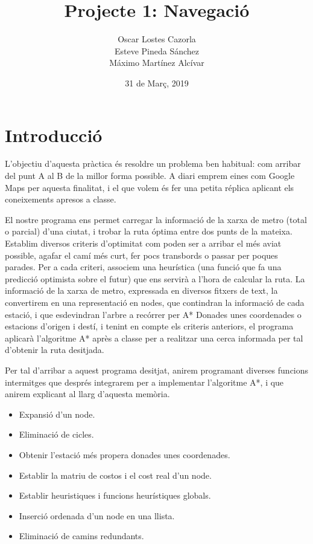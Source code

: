 \documentclass[a4paper,12pt]{article}
\begin{document}
    \title{\Large{\textbf{Projecte 1: Navegació}}}
    \author{Oscar Lostes Cazorla\\ Esteve Pineda Sánchez\\ Máximo Martínez Alcívar}
    \date{31 de Març, 2019}


    \maketitle
    \let\cleardoublepage\clearpage

    \pagebreak

    \section*{Introducció}

        L’objectiu d’aquesta pràctica és resoldre un problema ben habitual: com arribar del punt A al B de la millor forma possible. A diari emprem eines com Google Maps per aquesta finalitat, i el que volem és fer una petita réplica aplicant els coneixements apresos a classe.
        
        El nostre programa ens permet carregar la informació de la xarxa de metro (total o parcial) d’una ciutat, i trobar la ruta óptima entre dos punts de la mateixa. Establim diversos criteris d’optimitat com poden ser a arribar el més aviat possible, agafar el camí més curt, fer pocs transbords o passar per poques parades. Per a cada criteri, associem una heurística (una funció que fa una predicció optimista sobre el futur) que ens servirà a l’hora de calcular la ruta. La informació de la xarxa de metro, expressada en diversos fitxers de text, la convertirem en una representació en nodes, que contindran la informació de cada estació, i que esdevindran l’arbre a recórrer per A*
        Donades unes coordenades o estacions d'origen i destí, i tenint en compte els criteris anteriors, el programa aplicarà l’algoritme A* après a classe per a realitzar una cerca informada per tal d’obtenir la ruta desitjada.

        Per tal d’arribar a aquest programa desitjat, anirem programant diverses funcions intermitges que després integrarem per a implementar l’algoritme A*, i que anirem explicant al llarg d’aquesta memòria.
        \begin{itemize}
            \item Expansió d’un node.
            \item Eliminació de cicles.
            \item Obtenir l’estació més propera donades unes coordenades.
            \item Establir la matriu de costos i el cost real d’un node.
            \item Establir heuristiques i funcions heurístiques globals.
            \item Inserció ordenada d’un node en una llista.
            \item Eliminació de camins redundants.
        \end{itemize}
\end{document}

